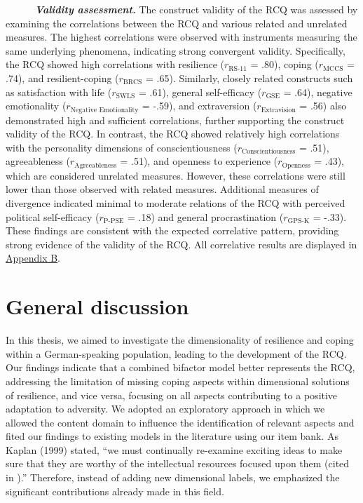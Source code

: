 \documentclass[
  man,floatsintext]{apa7}
\begin{document}
~~~~~~\textbf{\emph{Validity assessment.}} The construct validity of the RCQ was assessed by examining the correlations between the RCQ and various related and unrelated measures. The highest correlations were observed with instruments measuring the same underlying phenomena, indicating strong convergent validity. Specifically, the RCQ showed high correlations with resilience (\(r_{\text{RS-11}}\) = .80), coping (\(r_{\text{MCCS}}\) = .74), and resilient-coping (\(r_{\text{BRCS}}\) = .65). Similarly, closely related constructs such as satisfaction with life (\(r_{\text{SWLS}}\) = .61), general self-efficacy (\(r_{\text{GSE}}\) = .64), negative emotionality (\(r_{\text{Negative Emotionality}}\) = -.59), and extraversion (\(r_{\text{Extravision}}\) = .56) also demonstrated high and sufficient correlations, further supporting the construct validity of the RCQ. In contrast, the RCQ showed relatively high correlations with the personality dimensions of conscientiousness (\(r_{\text{Conscientiousness}}\) = .51), agreeableness (\(r_{\text{Agreeableness}}\) = .51), and openness to experience (\(r_{\text{Openness}}\) = .43), which are considered unrelated measures. However, these correlations were still lower than those observed with related measures. Additional measures of divergence indicated minimal to moderate relations of the RCQ with perceived political self-efficacy (\(r_{\text{P-PSE}}\) = .18) and general procrastination (\(r_{\text{GPS-K}}\) = -.33). These findings are consistent with the expected correlative pattern, providing strong evidence of the validity of the RCQ. All correlative results are displayed in \hyperref[appendixb]{Appendix B}.

\section{General discussion}\label{general-discussion}

In this thesis, we aimed to investigate the dimensionality of resilience and coping within a German-speaking population, leading to the development of the RCQ. Our findings indicate that a combined bifactor model better represents the RCQ, addressing the limitation of missing coping aspects within dimensional solutions of resilience, and vice versa, focusing on all aspects contributing to a positive adaptation to adversity. We adopted an exploratory approach in which we allowed the content domain to influence the identification of relevant aspects and fited our findings to existing models in the literature using our item bank. As Kaplan (1999) stated, ``we must continually re-examine exciting ideas to make sure that they are worthy of the intellectual resources focused upon them (cited in ).'' Therefore, instead of adding new dimensional labels, we emphasized the significant contributions already made in this field.
\end{document}
